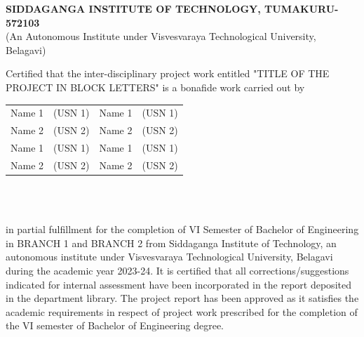 \begin{titlepage}
\begin{center}
 {\textbf {SIDDAGANGA INSTITUTE OF TECHNOLOGY, TUMAKURU-572103}} \\
{ (An Autonomous Institute under Visvesvaraya Technological University, Belagavi)}
{\color{red}{\Large	\bf CERTIFICATE}}\\[0.5cm]
\end{center}
Certified that the inter-disciplinary project work entitled {\color{blue}"TITLE OF THE PROJECT IN BLOCK LETTERS"} is a bonafide work carried out by \\
\begin{center}
\begin{tabular}{llll}
\color{blue} Name 1 & \color{blue} (USN 1) & \hspace*{4.0cm} \color{blue} Name 1 & \color{blue} (USN 1) \\
\color{blue} Name 2 & \color{blue} (USN 2) &\hspace*{4.0cm}\color{blue} Name 2 & \color{blue} (USN 2) \\
\color{blue} Name 1 & \color{blue} (USN 1) & \hspace*{4.0cm} \color{blue} Name 1 & \color{blue} (USN 1) \\
\color{blue} Name 2 & \color{blue} (USN 2) &\hspace*{4.0cm}\color{blue} Name 2 & \color{blue} (USN 2) \\
\end{tabular}\\[1.0cm]
\end{center}
\\
in  partial fulfillment for the completion of VI Semester of Bachelor of Engineering in  BRANCH 1    and BRANCH 2 
from Siddaganga Institute of Technology, an autonomous institute under Visvesvaraya Technological University, Belagavi during the academic year 2023-24. It is certified that all corrections/suggestions indicated for internal assessment have been incorporated in the report deposited in the department library. The project report has been approved as it satisfies the academic requirements in respect of project work prescribed for the completion of the VI semester of Bachelor of Engineering degree.\\
\\ \\ \\\begin{tabular}{ll}

\end{tabular}
\end{titlepage}
